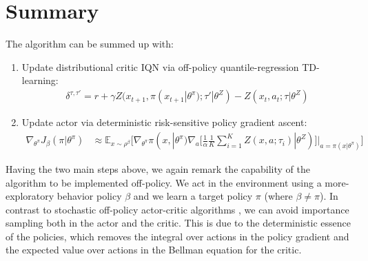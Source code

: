 \section{Summary}
The algorithm can be summed up with:

\begin{enumerate}
    \item Update distributional critic IQN via off-policy quantile-regression TD-learning:
    \begin{align}
        \delta^{\tau, \tau'} = r + \gamma Z(x_{t+1},\pi(x_{t+1}|\theta^\pi);\tau'| \theta^Z)-Z(x_t,a_t;\tau|\theta^Z) \label{eq:alg1}
    \end{align}
    \item Update actor via deterministic risk-sensitive policy gradient ascent:
    \begin{align}
        \nabla_{\theta^\pi} J_\beta(\pi | \theta^\pi) &\approx \mathbb E_{x \sim \rho^\beta} 
    \big [\nabla_{\theta^\pi} \pi(x,| \theta^\pi) \nabla_a  [\frac{1}{\alpha} \frac{1}{K}
    \sum_{i=1}^K Z(x,a; \tau_i) | \theta^Z)]|_{a=\pi(x| \theta^\pi)}  \big] \label{eq:alg2}
    \end{align}
\end{enumerate}

Having the two main steps above, we again remark the capability of the algorithm to be
implemented off-policy. We act in the environment using 
a more-exploratory behavior policy $\beta$ and we learn a
target policy $\pi$ (where $\beta \neq \pi$).
In contrast to stochastic off-policy actor-critic algorithms \citep{Degris2012}, we can avoid
importance sampling both in the actor and the critic.
This is due to the deterministic essence of the policies, which removes the integral over actions
in the policy gradient and the expected value over actions in the Bellman equation for the critic.
